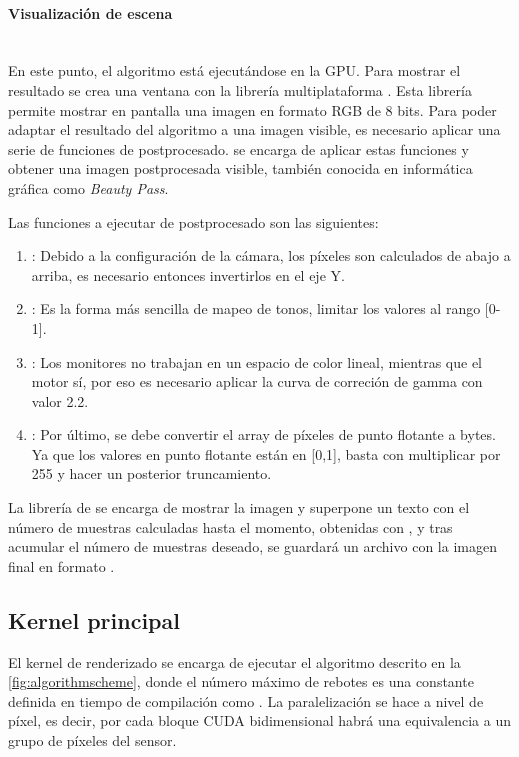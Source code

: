 \paragraph{Visualización de escena}\mbox{} \\

En este punto, el algoritmo está ejecutándose en la GPU. Para mostrar el resultado se crea una ventana con la librería multiplataforma . Esta librería permite mostrar en pantalla una imagen en formato RGB de 8 bits. Para poder adaptar el resultado del algoritmo a una imagen visible, es necesario aplicar una serie de funciones de postprocesado.  se encarga de aplicar estas funciones y obtener una imagen postprocesada visible, también conocida en informática gráfica como \emph{Beauty Pass}.

Las funciones a ejecutar de postprocesado son las siguientes:

\begin{enumerate}
	
	\item {}: Debido a la configuración de la cámara, los píxeles son calculados de abajo a arriba, es necesario entonces invertirlos en el eje Y.
	\item {}: Es la forma más sencilla de mapeo de tonos, limitar los valores al rango [0-1].
	\item {}: Los monitores no trabajan en un espacio de color lineal, mientras que el motor sí, por eso es necesario aplicar la curva de correción de gamma con valor 2.2.
	\item {}: Por último, se debe convertir el array de píxeles de punto flotante a bytes. Ya que los valores en punto flotante están en [0,1], basta con multiplicar por 255 y hacer un posterior truncamiento.

\end{enumerate}

La librería de  se encarga de mostrar la imagen y superpone un texto con el número de muestras calculadas hasta el momento, obtenidas con , y tras acumular el número de muestras deseado, se guardará un archivo con la imagen final en formato .


\subsection{Kernel principal}
	
El kernel de renderizado  se encarga de ejecutar el algoritmo descrito en la \autoref{fig:algorithmscheme}, donde el número máximo de rebotes es una constante definida en tiempo de compilación como . La paralelización se hace a nivel de píxel, es decir, por cada bloque CUDA bidimensional habrá una equivalencia a un grupo de píxeles del sensor.

